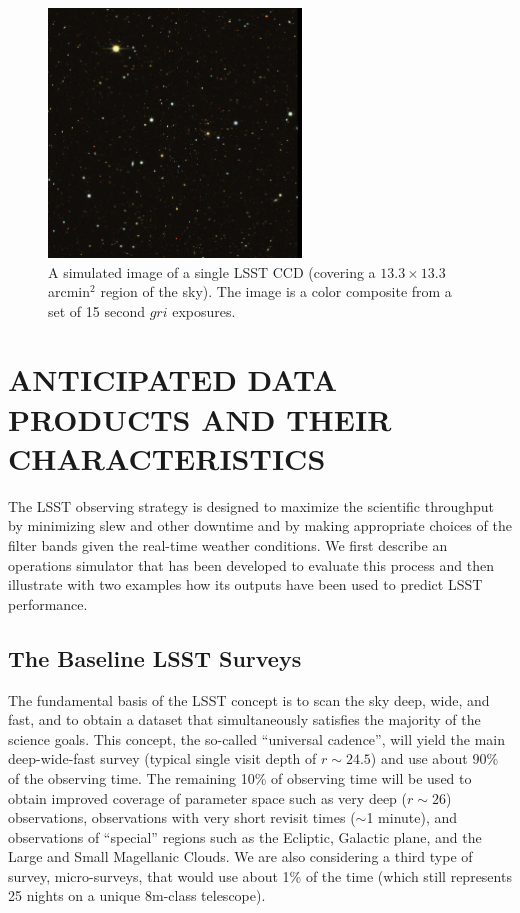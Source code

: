 \documentclass{emulateapj}
\begin{document}
\begin{figure}
\centerline{\includegraphics[width=0.6\textwidth,clip]{chip2014.jpg}}
\caption{ A simulated image of a single LSST CCD (covering a
  $13.3\times13.3$ arcmin$^2$ region of the sky). The image is a color
  composite from a set of 15 second $gri$ exposures.}
\label{Fig:ImSimExample}
\end{figure}



\section{    ANTICIPATED DATA PRODUCTS AND THEIR CHARACTERISTICS    }
\label{Sec:dataprod}

The LSST observing strategy is designed to maximize the scientific
throughput by minimizing slew and other downtime and by making appropriate
choices of the filter bands given the real-time weather conditions. We first
describe an operations simulator that has been developed to evaluate this process and then
illustrate with two examples how its outputs have been used to predict LSST
performance. 


\subsection{ The Baseline LSST Surveys }

The fundamental basis of the LSST concept is to scan the sky deep, wide, and
fast, and to obtain a dataset that simultaneously satisfies the majority
of the science goals. This concept, the so-called ``universal cadence'', will
yield the main deep-wide-fast survey (typical single visit depth of $r\sim24.5$)
and use about 90\% of the observing time. The remaining 10\% of observing 
time will be used to obtain improved coverage of parameter space such as 
very deep ($r\sim26$) observations, observations with very short revisit 
times ($\sim$1 minute), and observations of ``special'' regions such as the 
Ecliptic, Galactic plane, and the Large and Small Magellanic Clouds. 
We are also considering a third type of survey, micro-surveys, that would 
use about 1\% of the time (which still represents 25 nights on a unique 
8m-class telescope). 
\end{document}
